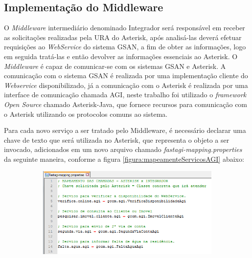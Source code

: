 \subsection{\textbf{Implementação do Middleware}}

O \textit{Middleware} intermediário denominado Integrador será responsável em receber as solicitações realizadas pela URA do Asterisk, após analisá-las deverá efetuar requisições ao \textit{WebService} do sistema GSAN, a fim de obter as informações, logo em seguida tratá-las e então devolver as informações essenciais ao Asterisk.
O \textit{Middleware} é capaz de comunicar-se com os sistemas GSAN e Asterisk. A comunicação com o sistema GSAN é realizada por uma implementação cliente do \textit{Webservice} disponibilizado, já a comunicação com o Asterisk é realizada por uma interface de comunicação chamada AGI, neste trabalho foi utilizado o \textit{framework} \textit{Open Source} chamado Asterisk-Java, que fornece recursos para comunicação com o Asterisk utilizando os protocolos comuns ao sistema.

Para cada novo serviço a ser tratado pelo Middleware, é necessário declarar uma chave de texto que será utilizada no Asterisk, que representa o objeto a ser invocado, adicionados em um novo arquivo chamado \textit{fastagi-mapping.properties} da seguinte maneira, conforme a figura \ref{figura:mapeamenteServicosAGI} abaixo:

\begin{figure}[H]
	\centering
	\caption{\textbf{Mapeamento dos serviços para consumo via AGI}}
	\label{figura:mapeamenteServicosAGI}
	\begin{subfigure}[H]{\textwidth}
		\centering
		\includegraphics{figuras/mapeamento_servicos_agi.png}
	\end{subfigure}
\end{figure}




